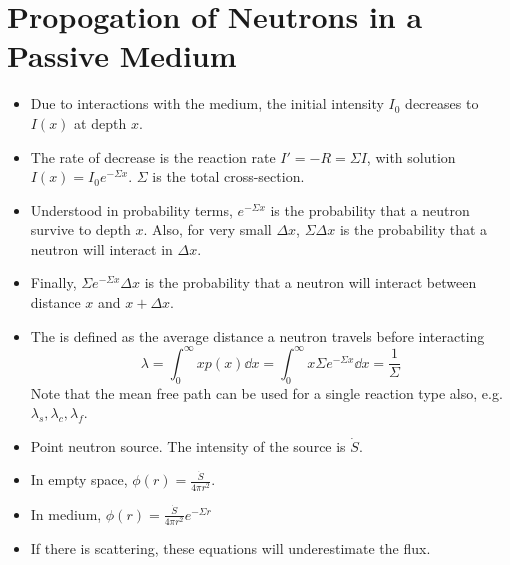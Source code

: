 \documentclass[a4paper]{article}
\begin{document}
\section{Propogation of Neutrons in a Passive Medium}
\begin{itemize}
    \item Due to interactions with the medium, the initial intensity $I_0$ decreases to $I(x)$ at depth $x$.
    \item The rate of decrease is the reaction rate $I'=-R=\Sigma I$, with solution $I(x)=I_0e^{-\Sigma x}$. $\Sigma$ is the total cross-section. 
    \item Understood in probability terms, $e^{-\Sigma x}$ is the probability that a neutron survive to depth $x$. Also, for very small $\Delta x$, $\Sigma\Delta x$ is the probability that a neutron will interact in $\Delta x$.
    \item Finally, $\Sigma e^{-\Sigma x}\Delta x$ is the probability that a neutron will interact between distance $x$ and $x+\Delta x$.
    \item The  is defined as the average distance a neutron travels before interacting \begin{equation}
        \lambda=\int_0^\infty xp(x)\dd x=\int_0^\infty x\Sigma e^{-\Sigma x}\dd x=\frac{1}{\Sigma}
    \end{equation}
    Note that the mean free path can be used for a single reaction type also, e.g. $\lambda_s, \lambda_c, \lambda_f$.
    \item Point neutron source. The intensity of the source is $\dot S$. 
    \item In empty space, $\phi(r)=\frac{\dot S}{4\pi r^2}$.
    \item In medium, $\phi(r)=\frac{\dot S}{4\pi r^2}e^{-\Sigma r}$
    \item If there is scattering, these equations will underestimate the flux.
\end{itemize}
\end{document}
